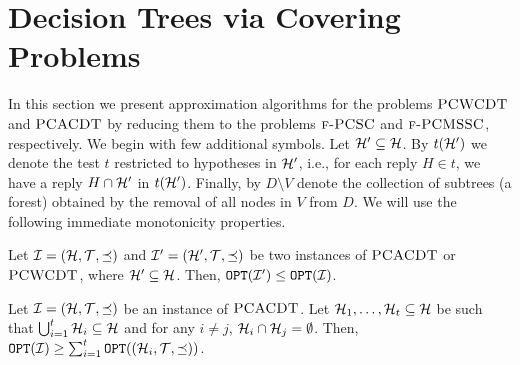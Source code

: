 \section{Decision Trees via Covering Problems} \label{ea:sec:AL}


In this section we present approximation algorithms for the problems $\textup{\textsc{PCWCDT}}$ and $\textup{\textsc{PCACDT}}$ by reducing them to the problems $\textup{\textsc{f-PCSC}}$ and $\textup{\textsc{f-PCMSSC}}$, respectively. 
We begin with few additional symbols.
Let $\mathcal{H}'\subseteq \mathcal{H}$. By $t\mathopen{}\left( \mathcal{H}' \right)$ we denote the test $t$ restricted to hypotheses in $\mathcal{H}'$, i.e., for each reply $H\in t$, we have a reply $H\cap \mathcal{H}'$ in $t\mathopen{}\left( \mathcal{H}' \right)$. Finally, by $D\setminus V$ denote the collection of subtrees (a forest) obtained by the removal of all nodes in $V$ from $D$.
We will use the following immediate monotonicity properties. 
\begin{lemma}\label{ea:lemma:subspace_opt}
    Let $\mathcal{I}=\mathopen{}\left( \mathcal{H}, \mathcal{T},\preceq \right)$ and $\mathcal{I}'=\mathopen{}\left( \mathcal{H}', \mathcal{T}, \preceq \right)$ be two instances of $\textup{\textsc{PCACDT}}$ or $\textup{\textsc{PCWCDT}}$, where $\mathcal{H}'\subseteq \mathcal{H}$.
    Then, $\texttt{OPT}\mathopen{}\left( \mathcal{I}' \right) \leq \texttt{OPT}\mathopen{}\left( \mathcal{I} \right)$.
\end{lemma}
\begin{lemma}\label{ea:lemma:subinstances_avg}
    Let $\mathcal{I}=(\mathcal{H}, \mathcal{T}, \preceq)$ be an instance of $\textup{\textsc{PCACDT}}$.
    Let $\mathcal{H}_1,\dots,\mathcal{H}_t\subseteq \mathcal{H}$ be such that $\bigcup_{i=1}^t \mathcal{H}_i \subseteq \mathcal{H}$ and for any $i\neq j$, $\mathcal{H}_i\cap \mathcal{H}_j = \emptyset$.
    Then, $\texttt{OPT}\mathopen{}\left( \mathcal{I} \right) \geq \sum_{i=1}^t \texttt{OPT}\mathopen{}\left( \mathopen{}\left( \mathcal{H}_i, \mathcal{T}, \preceq \right) \right)$.
\end{lemma}

